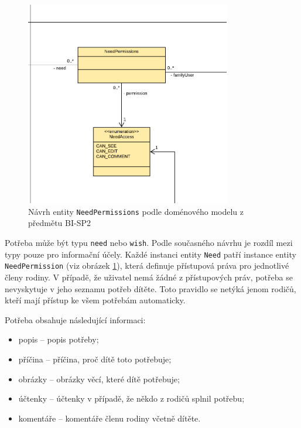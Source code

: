         \begin{figure}\centering
	        \includegraphics[width=0.8\textwidth]{pdfs/NeedPermissions1}
	        \caption[Návrh entity \texttt{NeedPermissions}]{Návrh entity \texttt{NeedPermissions} podle doménového modelu z předmětu BI-SP2}\label{image:NeedPermissions1}
        \end{figure}
        Potřeba může být typu \verb|need| nebo \verb|wish|. Podle současného návrhu je rozdíl mezi typy pouze pro informační účely. Každé instanci entity \verb|Need| patří instance entity \verb|NeedPermission| (viz obrázek \ref{image:NeedPermissions1}), která definuje přístupová práva pro jednotlivé členy rodiny. V případě, že uživatel nemá žádné z přístupových práv, potřeba se nevyskytuje v jeho seznamu potřeb dítěte. Toto pravidlo se netýká jenom rodičů, kteří mají přístup ke všem potřebám automaticky.
       
       Potřeba obsahuje následující informaci:
        \begin{itemize}
            \item popis -- popis potřeby;
            \item příčina -- příčina, proč dítě toto potřebuje;
            \item obrázky -- obrázky věcí, které dítě potřebuje;
            \item účtenky -- účtenky v případě, že někdo z rodičů splnil potřebu;
            \item komentáře -- komentáře členu rodiny včetně dítěte.
        \end{itemize}
    
